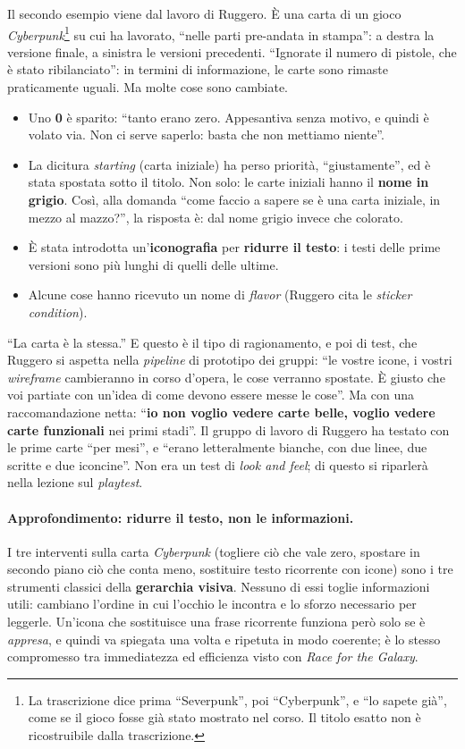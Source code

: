 Il secondo esempio viene dal lavoro di Ruggero. È una carta di un gioco
\emph{Cyberpunk}\footnote{La trascrizione dice prima ``Severpunk'', poi ``Cyberpunk'',
e ``lo sapete già'', come se il gioco fosse già stato mostrato nel corso. Il titolo
esatto non è ricostruibile dalla trascrizione.} su cui ha lavorato, ``nelle parti
pre-andata in stampa'': a destra la versione finale, a sinistra le versioni precedenti.
``Ignorate il numero di pistole, che è stato ribilanciato'': in termini di informazione,
le carte sono rimaste praticamente uguali. Ma molte cose sono cambiate.
\begin{itemize}
  \item Uno \textbf{0} è sparito: ``tanto erano zero. Appesantiva senza motivo, e
        quindi è volato via. Non ci serve saperlo: basta che non mettiamo niente''.
  \item La dicitura \emph{starting} (carta iniziale) ha perso priorità, ``giustamente'',
        ed è stata spostata sotto il titolo. Non solo: le carte iniziali hanno il
        \textbf{nome in grigio}. Così, alla domanda ``come faccio a sapere se è una
        carta iniziale, in mezzo al mazzo?'', la risposta è: dal nome grigio invece che
        colorato.
  \item È stata introdotta un'\textbf{iconografia} per \textbf{ridurre il testo}: i
        testi delle prime versioni sono più lunghi di quelli delle ultime.
  \item Alcune cose hanno ricevuto un nome di \emph{flavor} (Ruggero cita le
        \emph{sticker condition}).
\end{itemize}
``La carta è la stessa.'' E questo è il tipo di ragionamento, e poi di test, che
Ruggero si aspetta nella \emph{pipeline} di prototipo dei gruppi: ``le vostre icone, i
vostri \emph{wireframe} cambieranno in corso d'opera, le cose verranno spostate. È
giusto che voi partiate con un'idea di come devono essere messe le cose''. Ma con una
raccomandazione netta: ``\textbf{io non voglio vedere carte belle, voglio vedere carte
funzionali} nei primi stadi''. Il gruppo di lavoro di Ruggero ha testato con le prime
carte ``per mesi'', e ``erano letteralmente bianche, con due linee, due scritte e due
iconcine''. Non era un test di \emph{look and feel}; di questo si riparlerà nella
lezione sul \emph{playtest}.

\paragraph{Approfondimento: ridurre il testo, non le informazioni.} I tre interventi
sulla carta \emph{Cyberpunk} (togliere ciò che vale zero, spostare in secondo piano ciò
che conta meno, sostituire testo ricorrente con icone) sono i tre strumenti classici
della \textbf{gerarchia visiva}. Nessuno di essi toglie informazioni utili: cambiano
l'ordine in cui l'occhio le incontra e lo sforzo necessario per leggerle. Un'icona che
sostituisce una frase ricorrente funziona però solo se è \emph{appresa}, e quindi va
spiegata una volta e ripetuta in modo coerente; è lo stesso compromesso tra
immediatezza ed efficienza visto con \emph{Race for the Galaxy}.

